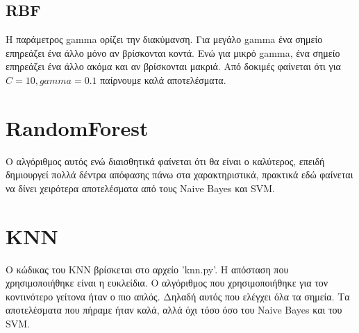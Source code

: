 \documentclass[a4paper,12pt]{article}
\begin{document}
        \subsection*{RBF}
            Η παράμετρος gamma ορίζει την διακύμανση. Για μεγάλο gamma ένα σημείο επηρεάζει ένα άλλο μόνο αν βρίσκονται κοντά.
            Ενώ για μικρό gamma, ένα σημείο επηρεάζει ένα άλλο ακόμα και αν βρίσκονται μακριά. Από δοκιμές φαίνεται ότι για
            $C=10, gamma=0.1$ παίρνουμε καλά αποτελέσματα.

    \section*{RandomForest}
        Ο αλγόριθμος αυτός ενώ διαισθητικά φαίνεται ότι θα είναι ο καλύτερος, επειδή δημιουργεί πολλά δέντρα απόφασης πάνω
        στα χαρακτηριστικά, πρακτικά εδώ φαίνεται να δίνει χειρότερα αποτελέσματα από τους Naive Bayes και SVM.

    \section*{KNN}
        Ο κώδικας του KNN βρίσκεται στο αρχείο 'knn.py'. Η απόσταση που χρησιμοποιήθηκε είναι η ευκλείδια. Ο αλγόριθμος
        που χρησιμοποιήθηκε για τον κοντινότερο γείτονα ήταν ο πιο απλός. Δηλαδή αυτός που ελέγχει όλα τα σημεία. Τα αποτελέσματα
        που πήραμε ήταν καλά, αλλά όχι τόσο όσο του Naive Bayes και του SVM.
\end{document}

